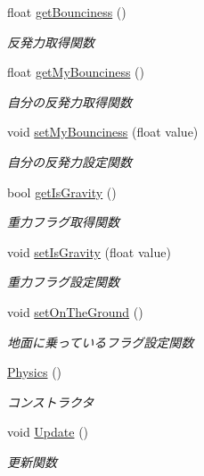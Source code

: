 \begin{DoxyCompactItemize}
float \mbox{\hyperlink{class_physics_afa061352341f5c53745433672be775bb}{get\+Bounciness}} ()
\begin{DoxyCompactList}\small\item\em 反発力取得関数 \end{DoxyCompactList}\item 
float \mbox{\hyperlink{class_physics_a25433df081fc471e1e5d475f718f116b}{get\+My\+Bounciness}} ()
\begin{DoxyCompactList}\small\item\em 自分の反発力取得関数 \end{DoxyCompactList}\item 
void \mbox{\hyperlink{class_physics_a4e23a9b6f9888b22d3043ea8463fbd37}{set\+My\+Bounciness}} (float value)
\begin{DoxyCompactList}\small\item\em 自分の反発力設定関数 \end{DoxyCompactList}\item 
bool \mbox{\hyperlink{class_physics_a7a4f2372930e737b61a73b2a41067158}{get\+Is\+Gravity}} ()
\begin{DoxyCompactList}\small\item\em 重力フラグ取得関数 \end{DoxyCompactList}\item 
void \mbox{\hyperlink{class_physics_af5f8eac3abc26f0255b5ec7dc67c11db}{set\+Is\+Gravity}} (float value)
\begin{DoxyCompactList}\small\item\em 重力フラグ設定関数 \end{DoxyCompactList}\item 
void \mbox{\hyperlink{class_physics_aad378ed29224e1bc00fd08ddc6122478}{set\+On\+The\+Ground}} ()
\begin{DoxyCompactList}\small\item\em 地面に乗っているフラグ設定関数 \end{DoxyCompactList}\item 
\mbox{\hyperlink{class_physics_a4b2ebc0a344f04f48d227c72f0d0fbda}{Physics}} ()
\begin{DoxyCompactList}\small\item\em コンストラクタ \end{DoxyCompactList}\item 
void \mbox{\hyperlink{class_physics_a13bf3e9de07a12afc3c0a4012e00d0a1}{Update}} ()
\begin{DoxyCompactList}\small\item\em 更新関数 \end{DoxyCompactList}\item 

\end{DoxyCompactItemize}
